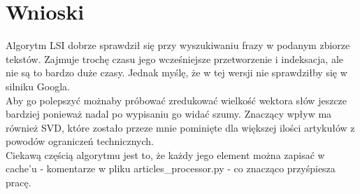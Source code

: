 \documentclass{article}
\begin{document}
\section{Wnioski}
Algorytm LSI dobrze sprawdził się przy wyszukiwaniu frazy w podanym zbiorze tekstów. Zajmuje trochę czasu jego wcześniejsze przetworzenie i indeksacja, ale nie są to bardzo duże czasy. Jednak myślę, że w tej wersji nie sprawdziłby się w silniku Googla. \\
Aby go polepszyć możnaby próbować zredukować wielkość wektora słów jeszcze bardziej ponieważ nadal po wypisaniu go widać szumy. Znaczący wpływ ma również SVD, które zostało przeze mnie pominięte dla większej ilości artykułów z powodów ograniczeń technicznych.\\
Ciekawą częścią algorytmu jest to, że każdy jego element można zapisać w cache'u - komentarze w pliku articles\_processor.py - co znacząco przyśpiesza pracę. 
\end{document}
